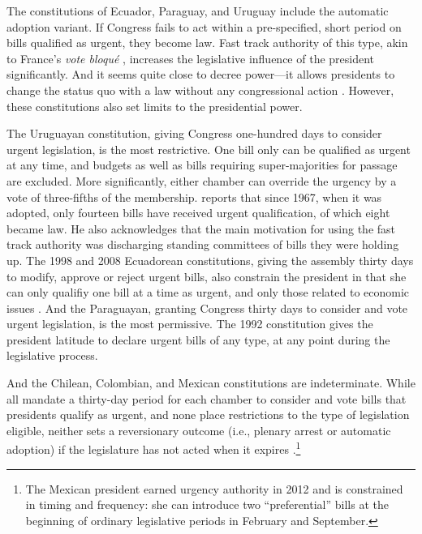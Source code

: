 \documentclass[letter,12pt]{article}
\begin{document}
The constitutions of Ecuador, Paraguay, and Uruguay include the automatic adoption variant. If Congress fails to act within a pre-specified, short period on bills qualified as urgent, they become law. Fast track authority of this type, akin to France's \emph{vote bloqué} \citep{huber.1996b}, increases the legislative influence of the president significantly. And it seems quite close to decree power---it allows presidents to change the status quo with a law without any congressional action \citep{carey.shugart.1998}. However, these constitutions also set limits to the presidential power. 

The Uruguayan constitution, giving Congress one-hundred days to consider urgent legislation, is the most restrictive. One bill only can be qualified as urgent at any time, and budgets as well as bills requiring super-majorities for passage are excluded. More significantly, either chamber can override the urgency by a vote of three-fifths of the membership. \citet{chasquetti.2016} reports that since 1967, when it was adopted, only fourteen bills have received urgent qualification, of which eight became law. He also acknowledges that the main motivation for using the fast track authority was discharging standing committees of bills they were holding up. The 1998 and 2008 Ecuadorean constitutions, giving the assembly thirty days to modify, approve or reject urgent bills, also constrain the president in that she can only qualifiy one bill at a time as urgent, and only those related to economic issues \citep{morgenstern-polga-shair.2013}. And the Paraguayan, granting Congress thirty days to consider and vote urgent legislation, is the most permissive. The 1992 constitution gives the president latitude to declare urgent bills of any type, at any point during the legislative process.

And the Chilean, Colombian, and Mexican constitutions are indeterminate. While all mandate a thirty-day period for each chamber to consider and vote bills that presidents qualify as urgent, and none place restrictions to the type of legislation eligible, neither sets a reversionary outcome (i.e., plenary arrest or automatic adoption) if the legislature has not acted when it expires \citep{nolte.2003,carroll-pachon.2016,magar.2014-refConst}.\footnote{The Mexican president earned urgency authority in 2012 and is constrained in timing and frequency: she can introduce two ``preferential'' bills at the beginning of ordinary legislative periods in February and September.}
\end{document}
